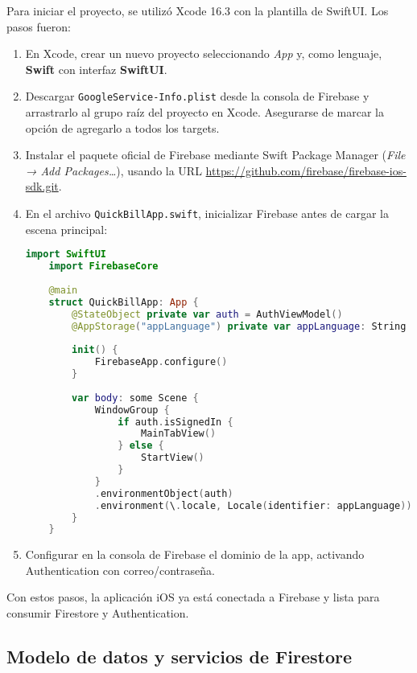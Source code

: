 \begin{large}

Para iniciar el proyecto, se utilizó Xcode 16.3 con la plantilla de SwiftUI. Los pasos fueron:

\begin{enumerate}
  \item En Xcode, crear un nuevo proyecto seleccionando \emph{App} y, como lenguaje, \textbf{Swift} con interfaz \textbf{SwiftUI}.
  \item Descargar \texttt{GoogleService-Info.plist} desde la consola de Firebase y arrastrarlo al grupo raíz del proyecto en Xcode. Asegurarse de marcar la opción de agregarlo a todos los targets.
  \item Instalar el paquete oficial de Firebase mediante Swift Package Manager (\emph{File → Add Packages…}), usando la URL \url{https://github.com/firebase/firebase-ios-sdk.git}.
  \item En el archivo \texttt{QuickBillApp.swift}, inicializar Firebase antes de cargar la escena principal:
    \begin{lstlisting}[language={swift}, caption={Inicialización de Firebase en QuickBillApp.swift}]
    import SwiftUI
    import FirebaseCore
    
    @main
    struct QuickBillApp: App {
        @StateObject private var auth = AuthViewModel()
        @AppStorage("appLanguage") private var appLanguage: String = AppLanguage.english.rawValue
        
        init() {
            FirebaseApp.configure()
        }
        
        var body: some Scene {
            WindowGroup {
                if auth.isSignedIn {
                    MainTabView()
                } else {
                    StartView()
                }
            }
            .environmentObject(auth)
            .environment(\.locale, Locale(identifier: appLanguage))
        }
    }
    \end{lstlisting}
  \item Configurar en la consola de Firebase el dominio de la app, activando Authentication con correo/contraseña.
\end{enumerate}

Con estos pasos, la aplicación iOS ya está conectada a Firebase y lista para consumir Firestore y Authentication.

\end{large}

\subsection{Modelo de datos y servicios de Firestore}

